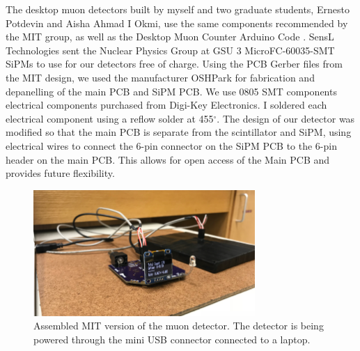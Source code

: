 The desktop muon detectors built by myself and two graduate students, Ernesto Potdevin and Aisha Ahmad I Okmi, use the same components recommended by the MIT group, as well as the Desktop Muon Counter Arduino Code \cite{MIT_Code}. SensL Technologies sent the Nuclear Physics Group at GSU 3 MicroFC-60035-SMT SiPMs to use for our detectors free of charge. Using the PCB Gerber files from the MIT design, we used the manufacturer OSHPark for fabrication and depanelling of the main PCB and SiPM PCB. We use 0805 SMT components electrical components purchased from Digi-Key Electronics. I soldered each electrical component using a reflow solder at 455$^{\circ}$. The design of our detector was modified so that the main PCB is separate from the scintillator and SiPM, using electrical wires to connect the 6-pin connector on the SiPM PCB to the 6-pin header on the main PCB. This allows for open access of the Main PCB and provides future flexibility. 
\begin{figure}[htb]
\centering
\includegraphics[width=0.75\textwidth]{images/FinalDetector_Setup.png} 
\caption{Assembled MIT version of the muon detector. The detector is being powered through the mini USB connector connected to a laptop.}
\label{MIT_WrappedScintillator}
\end{figure}


